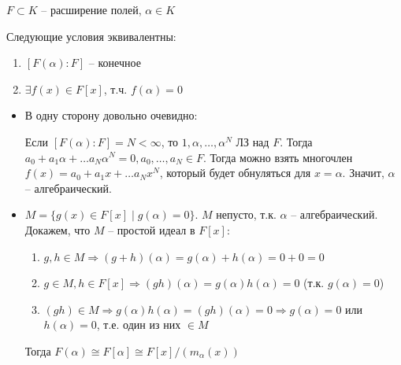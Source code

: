 $F \subset K$ -- расширение полей,  $\alpha \in K$

Следующие условия эквивалентны:

\begin{enumerate}
    \item $[F(\alpha):F]$ -- конечное
    \item $\exists f(x) \in F[x]$, т.ч. $f(\alpha) = 0$
\end{enumerate}

\Proof

\begin{itemize}
    \item В одну сторону довольно очевидно:
    
    Если  $[F(\alpha):F] = N < \infty$, то $1, \alpha, \ldots, \alpha^N$ ЛЗ над $F$. \newline Тогда $a_0 + a_1\alpha + \ldots a_N\alpha^N = 0, a_0, \ldots, a_N \in F$. \newline Тогда можно взять многочлен $f(x) = a_0 + a_1x + \ldots a_Nx^N$, который будет обнуляться для $x=\alpha$. Значит, $\alpha$ -- алгебраический.
    
    \item $M = \{g(x) \in F[x]\;|\; g(\alpha) = 0\}$. $M$ непусто, т.к. $\alpha$ -- алгебраический.\\
    
    Докажем, что $M$ -- простой идеал в $F[x]$:
    
    \begin{enumerate}
        \item $g, h \in M \Rightarrow (g + h)(\alpha) = g(\alpha) + h(\alpha) = 0 + 0 = 0$
        \item $g \in M, h \in F[x] \Rightarrow (gh)(\alpha) = g(\alpha)h(\alpha) = 0$ (т.к. $g(\alpha) = 0$)
        \item $(gh) \in M \Rightarrow g(\alpha)h(\alpha) = (gh)(\alpha) = 0 \Rightarrow g(\alpha) = 0$ или $h(\alpha) = 0$, т.е. один из них $\in M$
    \end{enumerate}
    
    Тогда $F(\alpha) \cong F[\alpha] \cong F[x]/(m_{\alpha}(x))$
\end{itemize}

\EndProof